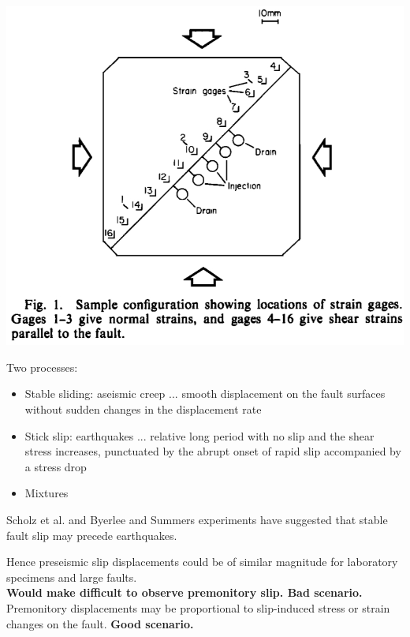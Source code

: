 \documentclass[aspectratio=43,9pt]{beamer}
\begin{document}
\begin{frame}{}

\begin{minipage}{0.45\linewidth}
  \includegraphics[width=1\linewidth]{Figs/figure_1.jpg}
\end{minipage}
\begin{minipage}{0.45\linewidth}
Two processes:
\begin{itemize}
 \item Stable sliding: aseismic creep ... smooth displacement on the fault surfaces without sudden changes in the displacement rate
 \item Stick slip: earthquakes ... relative long period with no slip and the shear stress increases, punctuated by the abrupt onset of rapid slip accompanied by a stress drop
 \item Mixtures
\end{itemize}
Scholz et al. and Byerlee and Summers experiments have suggested 
that stable fault slip may precede earthquakes.

\end{minipage}

\end{frame}

\begin{frame}
 
Hence preseismic slip displacements could be of similar magnitude for 
laboratory specimens and large faults. \\
{\bf Would make difficult to observe 
premonitory slip. Bad scenario.} \\
\vskip 0.5cm
Premonitory displacements may be proportional to slip-induced stress or 
strain changes on the fault. {\bf Good scenario.}

 

\end{frame}
\end{document}
